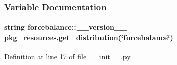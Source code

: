 \subsubsection{\-Variable \-Documentation}
\hypertarget{namespaceforcebalance_a6c10581ea309550b5703fbe56f62e8a2}{
\paragraph[{\-\_\-\-\_\-version\-\_\-\-\_\-}]{\setlength{\rightskip}{0pt plus 5cm}string {\bf forcebalance\-::\-\_\-\-\_\-version\-\_\-\-\_\-} = pkg\-\_\-resources.\-get\-\_\-distribution(\char`\"{}forcebalance\char`\"{})}}\label{namespaceforcebalance_a6c10581ea309550b5703fbe56f62e8a2}


\-Definition at line 17 of file \-\_\-\-\_\-init\-\_\-\-\_\-.\-py.

